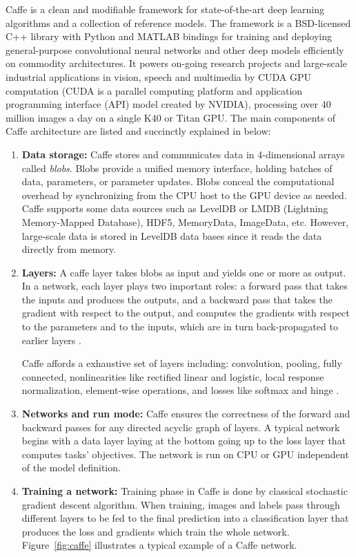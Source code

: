 Caffe is a clean and modifiable framework for state-of-the-art deep learning algorithms and a collection of reference models. The framework is a BSD-licensed C++ library with Python and MATLAB bindings for training and deploying general-purpose convolutional neural networks and other deep models efficiently on commodity architectures. It powers on-going research projects and large-scale industrial applications in vision, speech and multimedia by CUDA GPU computation (CUDA is a parallel computing platform and application programming interface (API) model created by NVIDIA\cite{cuda}), processing over 40 million images a day on a single K40 or Titan GPU\cite{jia2014caffe}. 
The main components of Caffe architecture are listed and succinctly explained in below:
\begin{enumerate}
\item \textbf{Data storage:} Caffe stores and communicates data in 4-dimensional arrays called \textit{blobs}. Blobs provide a unified memory interface, holding batches of data, parameters, or parameter updates. Blobs conceal the computational overhead by synchronizing from the CPU host to the GPU device as needed. Caffe supports some data sources such as LevelDB or LMDB (Lightning Memory-Mapped Database), HDF5, MemoryData, ImageData, etc. However, large-scale data is stored in LevelDB data bases since it reads the data directly from memory\cite{caffe}. 
\item \textbf{Layers:} A caffe layer takes blobs as input and yields one or more as output. In a network, each layer plays two important roles: a forward pass that takes the inputs and produces the outputs, and a backward pass that takes the gradient with respect to the output, and computes the gradients with respect to the parameters and to the inputs, which are in turn back-propagated to earlier layers \cite{jia2014caffe}.

\indent Caffe affords a exhaustive set of layers including: convolution, pooling, fully connected, nonlinearities like rectified
linear and logistic, local response normalization, element-wise operations, and losses like softmax and hinge \cite{jia2014caffe}.  
\item \textbf{Networks and run mode:} Caffe ensures the correctness of the forward and backward passes for any directed acyclic graph of layers. A typical network begins with a data layer laying at the bottom going up to the loss layer that computes tasks' objectives. The network is run on CPU or GPU independent of the model definition. 
\item \textbf{Training a network:} Training phase in Caffe is done by classical stochastic gradient descent algorithm. When training, images and labels pass through different layers to be fed to the final prediction into a classification layer that produces the loss and gradients which train the whole network. Figure~\ref{fig:caffe} illustrates a typical example of a Caffe network. 


\end{enumerate}
